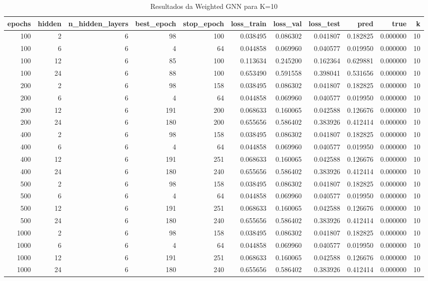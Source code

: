 \begin{table}
\caption{Resultados da Weighted GNN para K=10}
\label{tab:weighted_gnn_results_k10}
\begin{tabular}{rrrrrrrrrrr}
\toprule
epochs & hidden & n\_hidden\_layers & best\_epoch & stop\_epoch & loss\_train & loss\_val & loss\_test & pred & true & k \\
\midrule
100 & 2 & 6 & 98 & 100 & 0.038495 & 0.086302 & 0.041807 & 0.182825 & 0.000000 & 10 \\
100 & 6 & 6 & 4 & 64 & 0.044858 & 0.069960 & 0.040577 & 0.019950 & 0.000000 & 10 \\
100 & 12 & 6 & 85 & 100 & 0.113634 & 0.245200 & 0.162364 & 0.629881 & 0.000000 & 10 \\
100 & 24 & 6 & 88 & 100 & 0.653490 & 0.591558 & 0.398041 & 0.531656 & 0.000000 & 10 \\
200 & 2 & 6 & 98 & 158 & 0.038495 & 0.086302 & 0.041807 & 0.182825 & 0.000000 & 10 \\
200 & 6 & 6 & 4 & 64 & 0.044858 & 0.069960 & 0.040577 & 0.019950 & 0.000000 & 10 \\
200 & 12 & 6 & 191 & 200 & 0.068633 & 0.160065 & 0.042588 & 0.126676 & 0.000000 & 10 \\
200 & 24 & 6 & 180 & 200 & 0.655656 & 0.586402 & 0.383926 & 0.412414 & 0.000000 & 10 \\
400 & 2 & 6 & 98 & 158 & 0.038495 & 0.086302 & 0.041807 & 0.182825 & 0.000000 & 10 \\
400 & 6 & 6 & 4 & 64 & 0.044858 & 0.069960 & 0.040577 & 0.019950 & 0.000000 & 10 \\
400 & 12 & 6 & 191 & 251 & 0.068633 & 0.160065 & 0.042588 & 0.126676 & 0.000000 & 10 \\
400 & 24 & 6 & 180 & 240 & 0.655656 & 0.586402 & 0.383926 & 0.412414 & 0.000000 & 10 \\
500 & 2 & 6 & 98 & 158 & 0.038495 & 0.086302 & 0.041807 & 0.182825 & 0.000000 & 10 \\
500 & 6 & 6 & 4 & 64 & 0.044858 & 0.069960 & 0.040577 & 0.019950 & 0.000000 & 10 \\
500 & 12 & 6 & 191 & 251 & 0.068633 & 0.160065 & 0.042588 & 0.126676 & 0.000000 & 10 \\
500 & 24 & 6 & 180 & 240 & 0.655656 & 0.586402 & 0.383926 & 0.412414 & 0.000000 & 10 \\
1000 & 2 & 6 & 98 & 158 & 0.038495 & 0.086302 & 0.041807 & 0.182825 & 0.000000 & 10 \\
1000 & 6 & 6 & 4 & 64 & 0.044858 & 0.069960 & 0.040577 & 0.019950 & 0.000000 & 10 \\
1000 & 12 & 6 & 191 & 251 & 0.068633 & 0.160065 & 0.042588 & 0.126676 & 0.000000 & 10 \\
1000 & 24 & 6 & 180 & 240 & 0.655656 & 0.586402 & 0.383926 & 0.412414 & 0.000000 & 10 \\
\bottomrule
\end{tabular}
\end{table}
